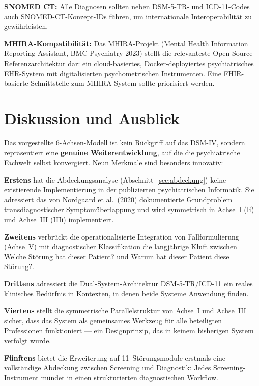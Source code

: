 \documentclass[11pt,a4paper]{article}
\begin{document}
\textbf{SNOMED CT:} Alle Diagnosen sollten neben DSM-5-TR- und ICD-11-Codes auch SNOMED-CT-Konzept-IDs f\"uhren, um internationale Interoperabilit\"at zu gew\"ahrleisten.

\textbf{MHIRA-Kompatibilit\"at:} Das MHIRA-Projekt (Mental Health Information Reporting Assistant, BMC Psychiatry 2023) stellt die relevanteste Open-Source-Referenzarchitektur dar: ein cloud-basiertes, Docker-deployiertes psychiatrisches EHR-System mit digitalisierten psychometrischen Instrumenten. Eine FHIR-basierte Schnittstelle zum MHIRA-System sollte priorisiert werden.


\section{Diskussion und Ausblick}
\label{sec:diskussion}

Das vorgestellte 6-Achsen-Modell ist kein R\"uckgriff auf das DSM-IV, sondern repr\"asentiert eine \textbf{genuine Weiterentwicklung}, auf die die psychiatrische Fachwelt selbst konvergiert. Neun Merkmale sind besonders innovativ:

\textbf{Erstens} hat die Abdeckungsanalyse (Abschnitt~\ref{sec:abdeckung}) keine existierende Implementierung in der publizierten psychiatrischen Informatik. Sie adressiert das von Nordgaard et al.\ (2020) dokumentierte Grundproblem transdiagnostischer Symptom\"uberlappung und wird symmetrisch in Achse~I (Ii) und Achse~III (IIIi) implementiert.

\textbf{Zweitens} verbr\"uckt die operationalisierte Integration von Fallformulierung (Achse~V) mit diagnostischer Klassifikation die langj\"ahrige Kluft zwischen \glqq Welche St\"orung hat dieser Patient?\grqq{} und \glqq Warum hat dieser Patient diese St\"orung?\grqq{}.

\textbf{Drittens} adressiert die Dual-System-Architektur DSM-5-TR/ICD-11 ein reales klinisches Bed\"urfnis in Kontexten, in denen beide Systeme Anwendung finden.

\textbf{Viertens} stellt die symmetrische Parallelstruktur von Achse~I und Achse~III sicher, dass das System als gemeinsames Werkzeug f\"ur alle beteiligten Professionen funktioniert --- ein Designprinzip, das in keinem bisherigen System verfolgt wurde.

\textbf{F\"unftens} bietet die Erweiterung auf 11~St\"orungsmodule erstmals eine vollst\"andige Abdeckung zwischen Screening und Diagnostik: Jedes Screening-Instrument m\"undet in einen strukturierten diagnostischen Workflow.
\end{document}
